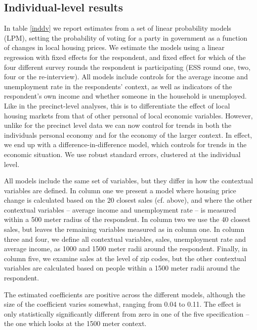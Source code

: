 \documentclass[12pt,a4paper]{article}
\begin{document}
	\subsection{Individual-level results}
	In table \ref{inddv} we report estimates from a set of linear probability models (LPM), setting the probability of voting for a party in government as a function of changes in local housing prices. We estimate the models using a linear regression with fixed effects for the respondent, and fixed effect for which of the four different survey rounds the respondent is participating (ESS round one, two, four or the re-interview). All models include controls for the average income and unemployment rate in the respondents’ context, as well as indicators of the respondent's own income and whether someone in the household is unemployed. Like in the precinct-level analyses, this is to differentiate the effect of local housing markets from that of other personal of local economic variables. However, unlike for the precinct level data we can now control for trends in both the individuals personal economy and for the economy of the larger context. In effect, we end up with a difference-in-difference model, which controls for trends in the economic situation. We use robust standard errors, clustered at the individual level.
	
	All models include the same set of variables, but they differ in how the contextual variables are defined. In column one we present a model where housing price change is calculated based on the 20 closest sales (cf. above), and where the other contextual variables -- average income and unemployment rate -- is measured within a 500 meter radius of the respondent. In column two we use the 40 closest sales, but leaves the remaining variables measured as in column one. In column three and four, we define all contextual variables, sales, unemployment rate and average income, as 1000 and 1500 meter radii around the respondent. Finally, in column five, we examine sales at the level of zip codes, but the other contextual variables are calculated based on people within a 1500 meter radii around the respondent.
	
	
	
	The estimated coefficients are positive across the different models, although the size of the coefficient varies somewhat, ranging from 0.04 to 0.11. The effect is only statistically significantly different from zero in one of the five specification -- the one which looks at the 1500 meter context.
	
\end{document}
